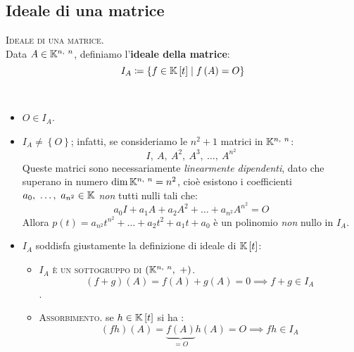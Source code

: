 \subsection{Ideale di una matrice}
\begin{define}\textsc{Ideale di una matrice.}\\
	Data $A\in\mathbb{K}^{n,\ n}$, definiamo l'\textbf{ideale della matrice}:
	\begin{equation}
		I_A\coloneqq\left\{f\in\mathbb{K}\left[t\right]\mid f\left(A\right)=O\right\}
	\end{equation}
\vspace{-6mm}
\end{define}
\begin{observe}~{}
	\begin{itemize}
		\item $O\in I_A$.
		\item $I_A\neq\left\{O\right\}$; infatti, se consideriamo le $n^2+1$ matrici in $\mathbb{K}^{n,\ n}$:
		\begin{equation*}
			I,\ A,\ A^2,\ A^3,\ \ldots,\ A^{n^2}
		\end{equation*}
	Queste matrici sono necessariamente \textit{linearmente dipendenti}, dato che superano in numero $\dim \kamp^{n,\ n}=n^2$, cioè esistono i coefficienti $a_0,\ \ldots,\ a_{n^2}\in\mathbb{K}$ \textit{non} tutti nulli tali che:
	\begin{equation*}
		a_0I+a_1A+a_2A^2+\ldots+a_{n^2}A^{n^2}=O
	\end{equation*}
	Allora $p\left(t\right)=a_{n^2}t^{n^2}+\ldots+a_2t^2+a_1t+a_0$ è un polinomio \textit{non} nullo in $I_A$.
	\item $I_A$ soddisfa giustamente la definizione di ideale di $\mathbb{K}\left[t\right]$:
	\begin{itemize}
		\item \textsc{$I_A$ è un sottogruppo di $\left(\kamp^{n,\ n},\ +\right)$}.
		\begin{equation*}
			\left(f+g\right)\left(A\right)=f\left(A\right)+g\left(A\right)=0\implies f+g\in I_A
		\end{equation*}.
		\item \textsc{Assorbimento}. se $h\in\mathbb{K}\left[t\right]$ si ha :
		\begin{equation*}
			\left(fh\right)\left(A\right)=\underbrace{f\left(A\right)}_{=O}h\left(A\right)=O\implies fh\in I_A
		\end{equation*}
	\end{itemize}
	\end{itemize}
\vspace{-3mm}
\end{observe}
